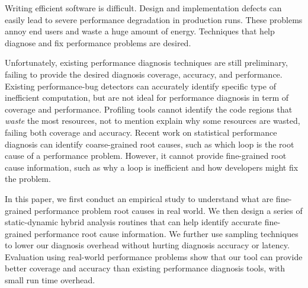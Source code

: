Writing efficient software is difficult.
Design and implementation defects can easily
lead to severe performance 
degradation in production runs. These problems annoy end users
and waste a huge amount of energy. Techniques that help
diagnose and fix performance problems are desired.

Unfortunately, existing performance diagnosis techniques are still preliminary,
failing to provide the desired diagnosis coverage, accuracy, and performance. 
Existing performance-bug detectors can accurately identify specific type
of inefficient computation, but are not ideal for performance diagnosis
in term of coverage and performance. 
Profiling tools cannot identify
the code regions that \textit{waste} the most resources, not to mention
explain why some resources are wasted, failing
both coverage and accuracy.
Recent work on statistical performance diagnosis can
identify coarse-grained root causes, such as which loop
is the root cause of a performance problem. However, it cannot provide 
fine-grained root cause information, such as why a loop is inefficient and
how developers might fix the problem.

In this paper, we first conduct an empirical study to understand what are
fine-grained performance problem root causes in real world. 
We then design a series of static-dynamic hybrid analysis routines that can
help identify accurate fine-grained performance root cause information.
We further use sampling techniques to lower our diagnosis overhead without
hurting diagnosis accuracy or latency. Evaluation using real-world performance
problems show that our tool can provide better coverage and accuracy than
existing performance diagnosis tools, with small run time overhead.
